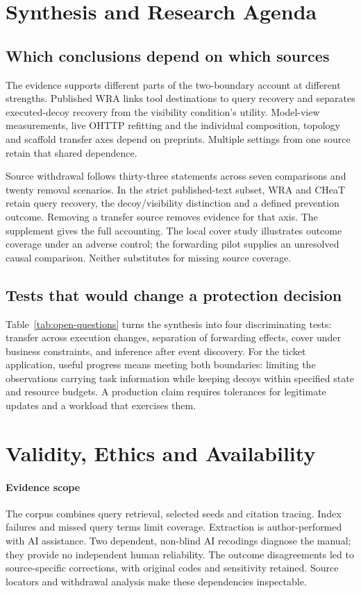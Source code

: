 \section{Synthesis and Research Agenda}\label{sec:agenda}
\subsection{Which conclusions depend on which sources}\label{sec:sensitivity}
The evidence supports different parts of the two-boundary account at different strengths. Published WRA links tool destinations to query recovery and separates executed-decoy recovery from the visibility condition's utility. Model-view measurements, live OHTTP refitting and the individual composition, topology and scaffold transfer axes depend on preprints. Multiple settings from one source retain that shared dependence.

Source withdrawal follows thirty-three statements across seven comparisons and twenty removal scenarios. In the strict published-text subset, WRA and CHeaT retain query recovery, the decoy/visibility distinction and a defined prevention outcome. Removing a transfer source removes evidence for that axis. The supplement gives the full accounting. The local cover study illustrates outcome coverage under an adverse control; the forwarding pilot supplies an unresolved causal comparison. Neither substitutes for missing source coverage.

\subsection{Tests that would change a protection decision}
Table~\ref{tab:open-questions} turns the synthesis into four discriminating tests: transfer across execution changes, separation of forwarding effects, cover under business constraints, and inference after event discovery. For the ticket application, useful progress means meeting both boundaries: limiting the observations carrying task information while keeping decoys within specified state and resource budgets. A production claim requires tolerances for legitimate updates and a workload that exercises them.


\section{Validity, Ethics and Availability}\label{sec:validity}
\paragraph{Evidence scope}
The corpus combines query retrieval, selected seeds and citation tracing. Index failures and missed query terms limit coverage. Extraction is author-performed with AI assistance. Two dependent, non-blind AI recodings diagnose the manual; they provide no independent human reliability. The outcome disagreements led to source-specific corrections, with original codes and sensitivity retained. Source locators and withdrawal analysis make these dependencies inspectable.

